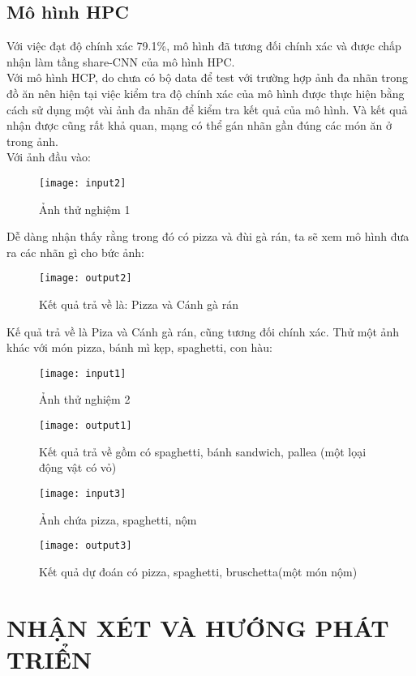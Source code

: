 \documentclass[13pt, a4paper]{extreport}
\begin{document}
\section {Mô hình HPC}
\indent Với việc đạt độ chính xác 79.1\%, mô hình đã tương đối chính xác và được chấp nhận làm tầng share-CNN của mô hình HPC.\\
\indent Với mô hình HCP, do chưa có bộ data để test với trường hợp ảnh đa nhãn trong đồ ăn nên hiện tại việc kiểm tra độ chính xác của mô hình được thực hiện bằng cách sử dụng một vài ảnh đa nhãn để kiểm tra kết quả của mô hình. Và kết quả nhận được cũng rất khả quan, mạng có thể gán nhãn gần đúng các món ăn ở trong ảnh.\\
\indent Với ảnh đầu vào:
\begin{figure}[H]
  \centering
    \texttt{[image: input2]}
   \caption{\large Ảnh thử nghiệm 1}
\end{figure}
\indent Dễ dàng nhận thấy rằng trong đó có pizza và đùi gà rán, ta sẽ xem mô hình đưa ra các nhãn gì cho bức ảnh:
\begin{figure}[H]
  \centering
    \texttt{[image: output2]}
   \caption{\large Kết quả trả về là: Pizza và Cánh gà rán}
\end{figure}
\indent Kế quả trả về là Piza và Cánh gà rán, cũng tương đối chính xác.
\newpage
\indent Thử một ảnh khác với món pizza, bánh mì kẹp, spaghetti, con hàu:
\begin{figure}[H]
  \centering
    \texttt{[image: input1]}
   \caption{\large Ảnh thử nghiệm 2}
\end{figure}

\begin{figure}[H]
  \centering
    \texttt{[image: output1]}
   \caption{\large Kết quả trả về gồm có spaghetti, bánh sandwich, pallea (một lọại động vật có vỏ)}
\end{figure}

\begin{figure}[H]
  \centering
    \texttt{[image: input3]}
   \caption{\large Ảnh chứa pizza, spaghetti, nộm}
\end{figure}

\begin{figure}[H]
  \centering
    \texttt{[image: output3]}
   \caption{\large Kết quả dự đoán có pizza, spaghetti, bruschetta(một món nộm)}
\end{figure}
\chapter{NHẬN XÉT VÀ HƯỚNG PHÁT TRIỂN}
\end{document}
